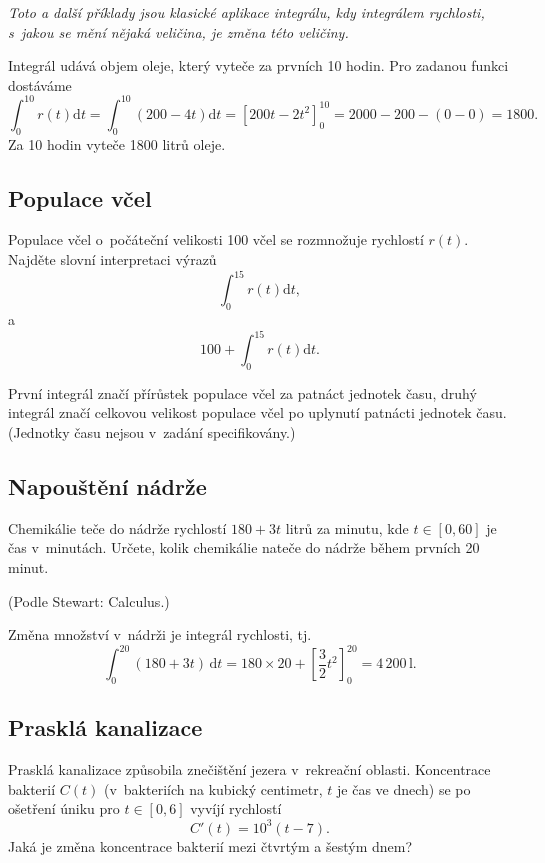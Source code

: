 \textit{Toto a další příklady jsou klasické aplikace integrálu, kdy integrálem rychlosti, s jakou se mění nějaká veličina, je změna této veličiny.}

\reseni Integrál udává objem oleje, který vyteče za prvních 10 hodin. Pro zadanou funkci dostáváme
\begin{equation*}
    \int_0^{10}r(t)\mathrm{d}t= \int_0^{10}(200-4t)\mathrm{d}t=
    \left[200t-2t^2\right]_0^{10}= 2000-200-(0-0)=1800.
  \end{equation*}
  Za 10 hodin vyteče 1800 litrů oleje.
\konec


\subsection{Populace včel}
 Populace včel o~počáteční velikosti 100 včel se rozmnožuje rychlostí $r(t)$. Najděte slovní interpretaci výrazů
\begin{equation*}
  \int_0^{15} r(t)\mathrm dt,
\end{equation*}
a
\begin{equation*}
  100+\int_0^{15} r(t)\mathrm dt.
\end{equation*}


\reseni První integrál značí přírůstek populace včel za patnáct jednotek času, druhý integrál značí celkovou velikost populace včel po uplynutí patnácti jednotek času. (Jednotky času nejsou v zadání specifikovány.)
\konec


\subsection{Napouštění nádrže} Chemikálie teče do nádrže rychlostí
$180+3t$ litrů za minutu, kde $t\in [0,60]$ je čas v~minutách. Určete, kolik chemikálie
nateče do nádrže během prvních 20 minut.

(Podle Stewart: Calculus.)

\reseni
Změna množství v nádrži je integrál rychlosti, tj. 
\begin{equation*}
  \int_0^{20} (180+3t)\,\mathrm dt=180\times 20 + \left[\frac 32 t^2\right]_0^{20}=4\, 200 \,\mathrm l.
\end{equation*}
\konec


\subsection{Prasklá kanalizace} Prasklá kanalizace způsobila znečištění jezera v rekreační
oblasti. Koncentrace bakterií $C(t)$ (v bakteriích na kubický
centimetr, $t$ je čas ve dnech) se po ošetření úniku pro $t\in[0,6]$  vyvíjí
rychlostí $$C'(t)=10^3(t-7).$$ Jaká je změna koncentrace bakterií mezi
čtvrtým a šestým dnem?

